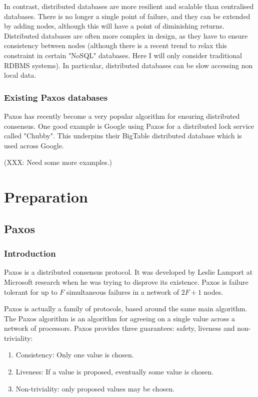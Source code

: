\documentclass[12pt,twoside,notitlepage]{report}
\begin{document}
In contrast, distributed databases are more resilient and scalable than centralised databases.
There is no longer a single point of failure, and they can be extended by adding nodes, although
this will have a point of diminishing returns. Distributed databases are often more complex in
design, as they have to ensure consistency between nodes (although there is a recent trend to
relax this constraint in certain "NoSQL" databases. Here I will only consider traditional RDBMS
systems). In particular, distributed databases can be slow accessing non local data.

\subsection*{Existing Paxos databases}

Paxos has recently become a very popular algorithm for ensuring distributed consensus. One good
example is Google using Paxos for a distributed lock service called "Chubby". This underpins their
BigTable distributed database which is used across Google.

(XXX: Need some more examples.)

\cleardoublepage

\chapter{Preparation}

\section{Paxos}

\subsection{Introduction}

Paxos is a distributed consensus protocol. It was developed by Leslie Lamport at Microsoft
research when he was trying to disprove its existence. Paxos is failure tolerant for up to $F$
simultaneous failures in a network of $2F + 1$ nodes.

Paxos is actually a family of protocols, based around the same main algorithm. The Paxos algorithm
is an algorithm for agreeing on a single value across a network of processors. Paxos provides
three guarantees: safety, liveness and non-triviality:

\begin{enumerate}
	\item Consistency: Only one value is chosen.
	\item Liveness: If a value is proposed, eventually some value is chosen.
	\item Non-triviality: only proposed values may be chosen.
\end{enumerate}
\end{document}

